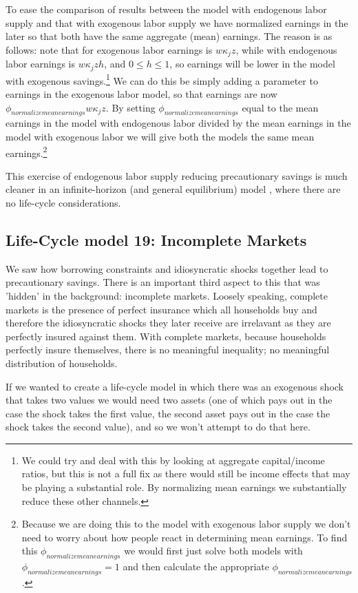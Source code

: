 To ease the comparison of results between the model with endogenous labor supply and that with exogenous labor supply we have normalized earnings in the later so that both have the same aggregate (mean) earnings. The reason is as follows: note that for exogenous labor earnings is $w \kappa_j z$, while with endogenous labor earnings is $w \kappa_j z h$, and $0 \leq h \leq 1$, so earnings will be lower in the model with exogenous savings.\footnote{We could try and deal with this by looking at aggregate capital/income ratios, but this is not a full fix as there would still be income effects that may be playing a substantial role. By normalizing mean earnings we substantially reduce these other channels.} We can do this be simply adding a parameter to earnings in the exogenous labor model, so that earnings are now $\phi_{normalizemeanearnings} w \kappa_j z$. By
setting $\phi_{normalizemeanearnings}$ equal to the mean earnings in the model with endogenous labor divided by the mean earnings in the model with exogenous labor we will give both the models the same mean earnings.\footnote{Because we are doing this to the model with exogenous labor supply we don't need to worry about how people react in determining mean earnings. To find this $\phi_{normalizemeanearnings}$ we would first just solve both models with $\phi_{normalizemeanearnings}=1$ and then calculate the appropriate $\phi_{normalizemeanearnings}$.}

This exercise of endogenous labor supply reducing precautionary savings is much cleaner in an infinite-horizon (and general equilibrium) model \citep*{PijoanMas2006}, where there are no life-cycle considerations.



\subsection{Life-Cycle model 19: Incomplete Markets}
We saw how borrowing constraints and idiosyncratic shocks together lead to precautionary savings. There is an important third aspect to this that was 'hidden' in the background: incomplete markets. Loosely speaking, complete markets is the presence of perfect insurance which all households buy and therefore the idiosyncratic shocks they later receive are irrelavant as they are perfectly insured against them. With complete markets, because households perfectly insure themselves, there is no meaningful inequality; no meaningful distribution of households.

If we wanted to create a life-cycle model in which there was an exogenous shock that takes two values we would need two assets (one of which pays out in the case the shock takes the first value, the second asset pays out in the case the shock takes the second value), and so we won't attempt to do that here.

